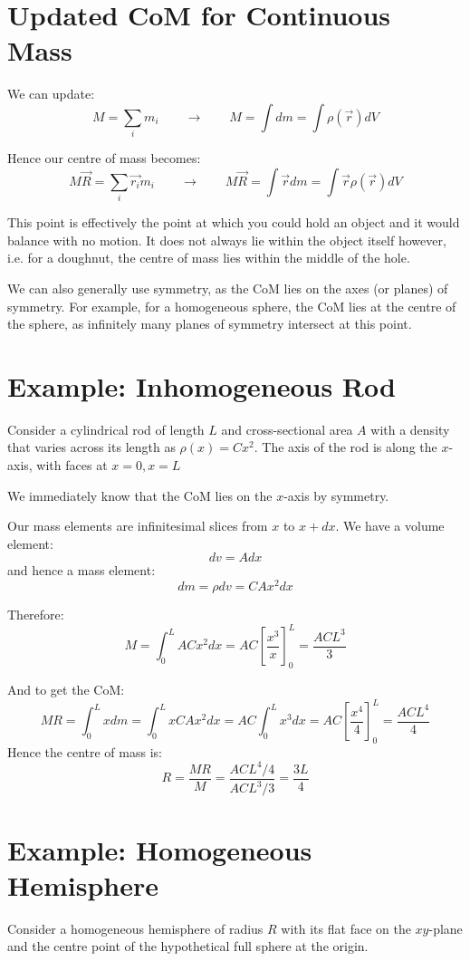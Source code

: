 
\section{Updated CoM for Continuous Mass}
We can update:
\[
    M = \sum_i m_i \qquad \to \qquad M = \int dm = \int \rho(\vec{r}) dV
\]

Hence our centre of mass becomes:
\[
    M \vec{R} = \sum_i \vec{r_i} m_i \qquad \to \qquad M \vec{R} = \int \vec{r} dm = \int \vec{r} \rho(\vec{r}) dV 
\]

This point is effectively the point at which you could hold an object and it would balance with no motion. It does not always lie within the object itself however, i.e. for a doughnut, the centre of mass lies within the middle of the hole.

We can also generally use symmetry, as the CoM lies on the axes (or planes) of symmetry. For example, for a homogeneous sphere, the CoM lies at the centre of the sphere, as infinitely many planes of symmetry intersect at this point.

\section{Example: Inhomogeneous Rod}
Consider a cylindrical rod of length $L$ and cross-sectional area $A$ with a density that varies across its length as $\rho(x) = Cx^2$. The axis of the rod is along the $x$-axis, with faces at $x = 0, x=L$

We immediately know that the CoM lies on the $x$-axis by symmetry.

Our mass elements are infinitesimal slices from $x$ to $x + dx$. We have a volume element:
\[
    dv = A dx
\]
and hence a mass element:
\[
    dm = \rho dv = CAx^2 dx
\]

Therefore:
\[
    M = \int_0^L ACx^2 dx = AC \left[\frac{x^3}{x}\right]_0^L = \frac{ACL^3}{3}
\]

And to get the CoM:
\[
    M R = \int_0^L x dm = \int_0^L x CAx^2 dx = AC \int_0^L x^3 dx = AC \left[\frac{x^4}{4}\right]_0^L = \frac{ACL^4}{4}
\]
Hence the centre of mass is:
\[
    R = \frac{M R}{M} = \frac{ACL^4/4}{ACL^3/3} = \frac{3L}{4}
\]

\section{Example: Homogeneous Hemisphere}
Consider a homogeneous hemisphere of radius $R$ with its flat face on the $xy$-plane and the centre point of the hypothetical full sphere at the origin.

